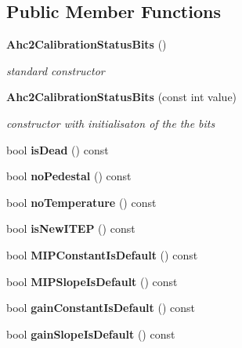 \subsection*{Public Member Functions}
\begin{DoxyCompactItemize}
\item 
{\bf Ahc2CalibrationStatusBits} ()
\begin{DoxyCompactList}\small\item\em standard constructor \item\end{DoxyCompactList}\item 
{\bf Ahc2CalibrationStatusBits} (const int value)
\begin{DoxyCompactList}\small\item\em constructor with initialisaton of the the bits \item\end{DoxyCompactList}\item 
bool {\bfseries isDead} () const \label{classCALICE_1_1Ahc2CalibrationStatusBits_ac0d15dd4f791b91c9c6ad5fe41fd6cc3}

\item 
bool {\bfseries noPedestal} () const \label{classCALICE_1_1Ahc2CalibrationStatusBits_a6edc0dfbb241566136c21ab01669fc51}

\item 
bool {\bfseries noTemperature} () const \label{classCALICE_1_1Ahc2CalibrationStatusBits_a9fb04b1b5428592afefa219ecf9aec49}

\item 
bool {\bfseries isNewITEP} () const \label{classCALICE_1_1Ahc2CalibrationStatusBits_a6fb3027bf68829d150668f0184423ecd}

\item 
bool {\bfseries MIPConstantIsDefault} () const \label{classCALICE_1_1Ahc2CalibrationStatusBits_af11386a9a08c65042522c4b2af4f9f6f}

\item 
bool {\bfseries MIPSlopeIsDefault} () const \label{classCALICE_1_1Ahc2CalibrationStatusBits_a50b4fe7b0aa00e0483bb59a2d99af59f}

\item 
bool {\bfseries gainConstantIsDefault} () const \label{classCALICE_1_1Ahc2CalibrationStatusBits_a7098ed6fd937b62c040c929eb40682d1}

\item 
bool {\bfseries gainSlopeIsDefault} () const \label{classCALICE_1_1Ahc2CalibrationStatusBits_a4bb22c8217cdf4b6b0ac9c181aedb3a3}


\end{DoxyCompactItemize}
